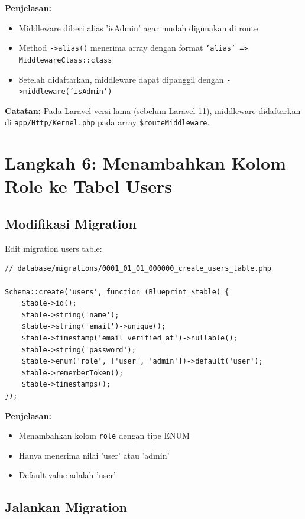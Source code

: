 \documentclass[a4paper,oneside,11pt]{book}
\begin{document}
\textbf{Penjelasan:}
\begin{itemize}
    \item Middleware diberi alias 'isAdmin' agar mudah digunakan di route
    \item Method \texttt{->alias()} menerima array dengan format \texttt{'alias' => MiddlewareClass::class}
    \item Setelah didaftarkan, middleware dapat dipanggil dengan \texttt{->middleware('isAdmin')}
\end{itemize}

\textbf{Catatan:} Pada Laravel versi lama (sebelum Laravel 11), middleware didaftarkan di \texttt{app/Http/Kernel.php} pada array \texttt{\$routeMiddleware}.

\section{Langkah 6: Menambahkan Kolom Role ke Tabel Users}

\subsection{Modifikasi Migration}

Edit migration users table:

\begin{lstlisting}[style=phpstyle]
// database/migrations/0001_01_01_000000_create_users_table.php

Schema::create('users', function (Blueprint $table) {
    $table->id();
    $table->string('name');
    $table->string('email')->unique();
    $table->timestamp('email_verified_at')->nullable();
    $table->string('password');
    $table->enum('role', ['user', 'admin'])->default('user');
    $table->rememberToken();
    $table->timestamps();
});
\end{lstlisting}

\textbf{Penjelasan:}
\begin{itemize}
    \item Menambahkan kolom \texttt{role} dengan tipe ENUM
    \item Hanya menerima nilai 'user' atau 'admin'
    \item Default value adalah 'user'
\end{itemize}

\subsection{Jalankan Migration}
\end{document}
